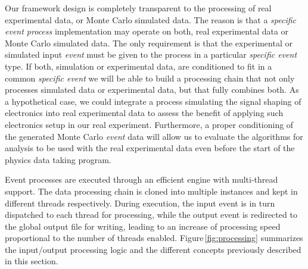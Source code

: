 Our framework design is completely transparent to the processing of real experimental data, or Monte Carlo simulated data. The reason is that a \emph{specific event process} implementation may operate on both, real experimental data or Monte Carlo simulated data. The only requirement is that the experimental or simulated input \emph{event} must be given to the process in a particular \emph{specific event} type. If both, simulation or experimental data, are conditioned to fit in a common \emph{specific event} we will be able to build a processing chain that not only processes simulated data or experimental data, but that fully combines both. As a hypothetical case, we could integrate a process simulating the signal shaping of electronics into real experimental data to assess the benefit of applying such electronics setup in our real experiment. Furthermore, a proper conditioning of the generated Monte Carlo \emph{event} data will allow us to evaluate the algorithms for analysis to be used with the real experimental data even before the start of the physics data taking program.





Event processes are executed through an efficient engine with multi-thread support. The data processing chain is cloned into multiple instances and kept in different threads respectively. During execution, the input event is in turn dispatched to each thread for processing, while the output event is redirected to the global output file for writing, leading to an increase of processing speed proportional to the number of threads enabled. Figure\,\ref{fig:processing} summarizes the input/output processing logic and the different concepts previously described in this section.   %

